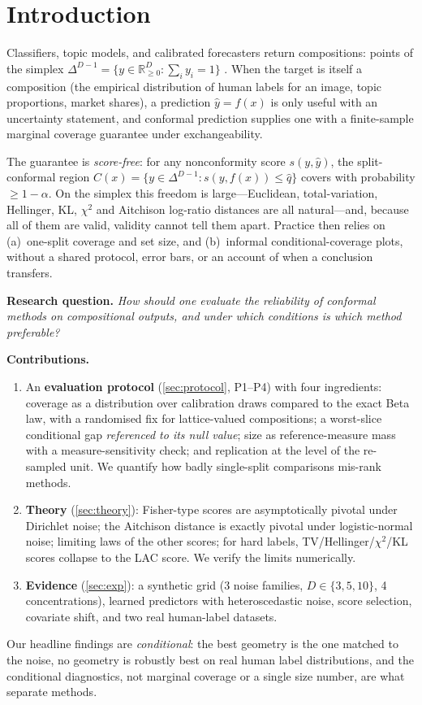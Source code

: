 \documentclass{article}
\theoremstyle{plain}
\theoremstyle{remark}
\newcommand{\simplex}{\Delta^{D-1}}
\newcommand{\yh}{\hat y}
\begin{document}
\section{Introduction}
Classifiers, topic models, and calibrated forecasters return compositions: points of the simplex $\simplex=\{y\in\mathbb{R}^D_{\ge0}:\sum_i y_i=1\}$ \citep{aitchison1982}.
When the target is itself a composition (the empirical distribution of human labels for an image, topic proportions, market shares), a prediction $\yh=f(x)$ is only useful with an uncertainty statement, and conformal prediction \citep{vovk2005,lei2018,angelopoulos2021gentle} supplies one with a finite-sample marginal coverage guarantee under exchangeability.

The guarantee is \emph{score-free}: for any nonconformity score $s(y,\yh)$, the split-conformal region $C(x)=\{y\in\simplex: s(y,f(x))\le\hat q\}$ covers with probability $\ge 1-\alpha$.
On the simplex this freedom is large---Euclidean, total-variation, Hellinger, KL, $\chi^2$ and Aitchison log-ratio distances \citep{aitchison1982,egozcue2003} are all natural---and, because all of them are valid, validity cannot tell them apart.
Practice then relies on (a)~one-split coverage and set size, and (b)~informal conditional-coverage plots, without a shared protocol, error bars, or an account of when a conclusion transfers.

\textbf{Research question.} \emph{How should one evaluate the reliability of conformal methods on compositional outputs, and under which conditions is which method preferable?}

\textbf{Contributions.}
\begin{enumerate}\itemsep0pt
\item An \textbf{evaluation protocol} (\cref{sec:protocol}, P1--P4) with four ingredients: coverage as a distribution over calibration draws compared to the exact Beta law, with a randomised fix for lattice-valued compositions; a worst-slice conditional gap \emph{referenced to its null value}; size as reference-measure mass with a measure-sensitivity check; and replication at the level of the re-sampled unit. We quantify how badly single-split comparisons mis-rank methods.
\item \textbf{Theory} (\cref{sec:theory}): Fisher-type scores are asymptotically pivotal under Dirichlet noise; the Aitchison distance is exactly pivotal under logistic-normal noise; limiting laws of the other scores; for hard labels, TV/Hellinger/$\chi^2$/KL scores collapse to the LAC score. We verify the limits numerically.
\item \textbf{Evidence} (\cref{sec:exp}): a synthetic grid (3 noise families, $D\in\{3,5,10\}$, 4 concentrations), learned predictors with heteroscedastic noise, score selection, covariate shift, and two real human-label datasets.
\end{enumerate}
Our headline findings are \emph{conditional}: the best geometry is the one matched to the noise, no geometry is robustly best on real human label distributions, and the conditional diagnostics, not marginal coverage or a single size number, are what separate methods.
\end{document}
